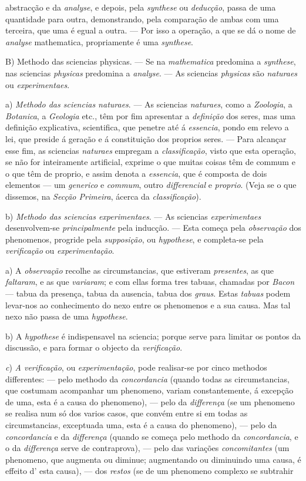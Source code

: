 abstracção e da \emph{analyse}, e depois, pela \emph{synthese} ou \emph{deducção}, passa de uma quantidade para outra, demonstrando, pela comparação de ambas com uma terceira, que uma é egual a outra. --- Por isso a operação, a que se dá o nome de \emph{analyse} mathematica, propriamente é uma \emph{synthese}.\par B) Methodo das sciencias physicas. --- Se na \emph{mathematica} predomina a \emph{synthese}, nas sciencias \emph{physicas} predomina a \emph{analyse}. --- As sciencias \emph{physicas} são \emph{naturaes} ou \emph{experimentaes}.\par a) \emph{Methodo das sciencias naturaes}. --- As sciencias \emph{naturaes}, como a \emph{Zoologia}, a \emph{Botanica}, a \emph{Geologia} etc., têm por fim apresentar a \emph{definição} dos seres, mas uma definição explicativa, scientifica, que penetre até á \emph{essencia}, pondo em relevo a lei, que preside á geração e á constituição dos proprios seres. --- Para alcançar esse fim, as sciencias \emph{naturaes} empregam a \emph{classificação}, visto que esta operação, se não for inteiramente artificial, exprime o que muitas coisas têm de commum e o que têm de proprio, e assim denota a \emph{essencia}, que é composta de dois elementos --- um \emph{generico} e \emph{commum}, outro \emph{differencial} e \emph{proprio}. (Veja se o que dissemos, na \emph{Secção Primeira}, ácerca da \emph{classificação}).\par b) \emph{Methodo das sciencias experimentaes}. --- As sciencias \emph{experimentaes} desenvolvem-se \emph{principalmente} pela inducção. --- Esta começa pela \emph{observação} dos phenomenos, progride pela \emph{supposição}, ou \emph{hypothese}, e completa-se pela \emph{verificação} ou \emph{experimentação}.\par a) A \emph{observação} recolhe as circumstancias, que estiveram \emph{presentes}, as que \emph{faltaram}, e as que \emph{variaram}; e com ellas forma tres tabuas, chamadas por \emph{Bacon} --- tabua da presença, tabua da ausencia, tabua dos \emph{graus}. Estas \emph{tabuas} podem levar-nos ao conhecimento do nexo entre os phenomenos e a sua causa. Mas tal nexo não passa de uma \emph{hypothese}.\par b) A \emph{hypothese} é indispensavel na sciencia; porque serve para limitar os pontos da discussão, e para formar o objecto da \emph{verificação}.\par \emph{c}) \emph{A verificação}, ou \emph{experimentação}, pode realisar-se por cinco methodos differentes: --- pelo methodo da \emph{concordancia} (quando todas as circumstancias, que costumam acompanhar um phenomeno, variam constantemente, á excepção de uma, esta é a causa do phenomeno), --- pelo da \emph{differença} (se um phenomeno se realisa num só dos varios casos, que convém entre si em todas as circumstancias, exceptuada uma, esta é a causa do phenomeno), --- pelo da \emph{concordancia} e da \emph{differença} (quando se começa pelo methodo da \emph{concordancia}, e o da \emph{differença} serve de contraprova), --- pelo das variações \emph{concomitantes} (um phenomeno, que augmenta ou diminue; augmentando ou diminuindo uma causa, é effeito d' esta causa), --- dos \emph{restos} (se de um phenomeno complexo se subtrahir 
